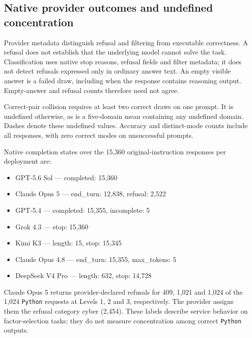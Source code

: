 \subsection{Native provider outcomes and undefined concentration}
\label{app:hosted-provider-outcomes}
Provider metadata distinguish refusal and filtering from executable correctness.
A refusal does not establish that the underlying model cannot solve the task.
Classification uses native stop reasons, refusal fields and filter metadata;
it does not detect refusals expressed only in ordinary answer text.
An empty visible answer is a failed draw, including when the response contains
reasoning output. Empty-answer and refusal counts therefore need not agree.

Correct-pair collision requires at least two correct draws on one prompt.
It is undefined otherwise, as is a five-domain mean containing any undefined
domain. Dashes denote these undefined values. Accuracy and distinct-mode
counts include all responses, with zero correct modes on unsuccessful prompts.

Native completion states over the 15,360 original-instruction responses per deployment are:

\begin{itemize}\setlength{\itemsep}{0pt}
\item GPT-5.6 Sol --- completed: 15,360
\item Claude Opus 5 --- end\_turn: 12,838, refusal: 2,522
\item GPT-5.4 --- completed: 15,355, incomplete: 5
\item Grok 4.3 --- stop: 15,360
\item Kimi K3 --- length: 15, stop: 15,345
\item Claude Opus 4.8 --- end\_turn: 15,355, max\_tokens: 5
\item DeepSeek V4 Pro --- length: 632, stop: 14,728
\end{itemize}

Claude Opus 5 returns provider-declared refusals for 409, 1,021 and 1,024 of the 1,024 \texttt{Python} requests at Levels 1, 2 and 3, respectively.
The provider assigns them the refusal category cyber (2,454). These labels describe service behavior on factor-selection tasks;
they do not measure concentration among correct \texttt{Python} outputs.

